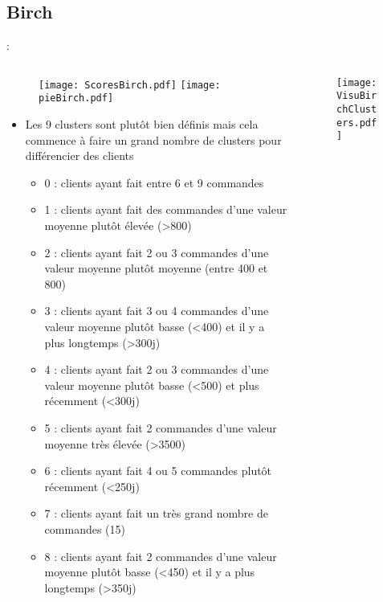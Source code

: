 \documentclass[8pt,aspectratio=169,hyperref={unicode=true}]{beamer}
\begin{document}
\subsection{Birch}
\begin{frame}{\insertsection: \insertsubsection}
    \begin{columns}
        \begin{column}{.55\textwidth}
            \begin{figure}
                \hfill
                \texttt{[image: ScoresBirch.pdf]}
                \hfill
                \texttt{[image: pieBirch.pdf]}
                \hfill
            \end{figure}
            \begin{itemize}
                \footnotesize
                \item Les 9 clusters sont plutôt bien définis mais cela commence à faire un grand nombre de clusters pour différencier des clients
                      \begin{itemize}
                          \scriptsize
                          \item 0 : clients ayant fait entre 6 et 9 commandes
                          \item 1 : clients ayant fait des commandes d'une valeur moyenne plutôt élevée (>800)
                          \item 2 : clients ayant fait 2 ou 3 commandes d'une valeur moyenne plutôt moyenne (entre 400 et 800)
                          \item 3 : clients ayant fait 3 ou 4 commandes d'une valeur moyenne plutôt basse (<400) et il y a plus longtemps (>300j)
                          \item 4 : clients ayant fait 2 ou 3 commandes d'une valeur moyenne plutôt basse (<500) et plus récemment (<300j)
                          \item 5 : clients ayant fait 2 commandes d'une valeur moyenne très élevée (>3500)
                          \item 6 : clients ayant fait 4 ou 5 commandes plutôt récemment (<250j)
                          \item 7 : clients ayant fait un très grand nombre de commandes (15)
                          \item 8 : clients ayant fait 2 commandes d'une valeur moyenne plutôt basse (<450) et il y a plus longtemps (>350j)
                      \end{itemize}
            \end{itemize}
        \end{column}
        \begin{column}{.45\textwidth}
            \begin{figure}
                \texttt{[image: VisuBirchClusters.pdf]}
            \end{figure}
        \end{column}
    \end{columns}
\end{frame}
\end{document}
